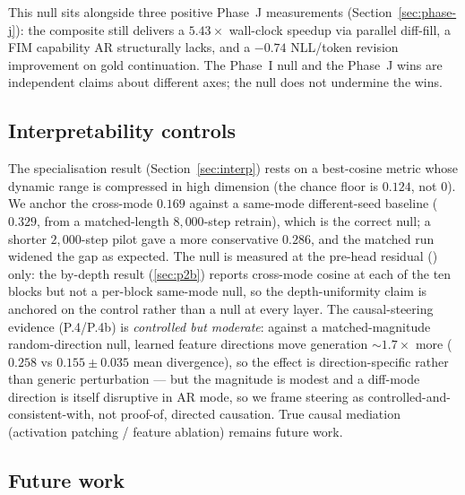 This null sits alongside three positive Phase~J measurements
(Section~\ref{sec:phase-j}): the composite still delivers a
$5.43\times$ wall-clock speedup via parallel diff-fill, a FIM
capability AR structurally lacks, and a $-0.74$ NLL/token revision
improvement on gold continuation. The Phase~I null and the Phase~J
wins are independent claims about different axes; the null does not
undermine the wins.

\subsection{Interpretability controls}

The specialisation result (Section~\ref{sec:interp}) rests on a
best-cosine metric whose dynamic range is compressed in high dimension
(the chance floor is $0.124$, not $0$). We anchor the cross-mode
$0.169$ against a same-mode different-seed baseline ($0.329$, from a
matched-length $8{,}000$-step retrain), which is the correct null; a
shorter $2{,}000$-step pilot gave a more conservative $0.286$, and the
matched run widened the gap as expected. The null is measured at the
pre-head residual ()
only: the by-depth result (\textsection\ref{sec:p2b}) reports
cross-mode cosine at each of the ten blocks but not a per-block
same-mode null, so the depth-uniformity claim is anchored on the
 control rather than a null at every layer. The
causal-steering evidence (P.4/P.4b) is \emph{controlled but moderate}:
against a matched-magnitude random-direction null, learned feature
directions move generation $\sim\!1.7\times$ more ($0.258$ vs
$0.155 \pm 0.035$ mean divergence), so the effect is direction-specific
rather than generic perturbation --- but the magnitude is modest and a
diff-mode direction is itself disruptive in AR mode, so we frame
steering as controlled-and-consistent-with, not proof-of, directed
causation. True causal mediation (activation patching / feature
ablation) remains future work.

\subsection{Future work}

